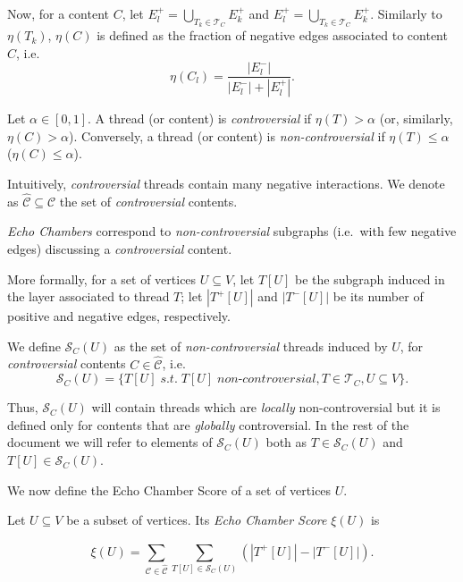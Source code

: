 Now, for a content $C$, let $E^{+}_l = \bigcup_{T_k \in \mathcal{T} _C} E^+_k$
and $E^{+}_l = \bigcup_{T_k \in \mathcal{T} _C} E^+_k$.
Similarly to $\eta(T_k)$, $\eta(C)$ is defined as the fraction of negative edges associated to
content $C$, i.e.
\begin{equation*}
	\eta(C_l) = \frac{|E^{-}_{l}|}{|E^{-}_{l}| + |E^{+}_{l}|}.
\end{equation*}

\begin{definition}
	Let $\alpha \in [0,1]$. A thread (or content) is \emph{controversial} if
	$\eta(T) > \alpha$ (or, similarly, $\eta(C) > \alpha $). Conversely, a
	thread (or content) is \emph{non-controversial} if $\eta(T) \leq \alpha$
	($\eta(C) \leq \alpha$).
\end{definition}

Intuitively, \emph{controversial} threads contain many negative
interactions. We denote as $\hat{\mathcal{C} } \subseteq \mathcal{C} $ the
set of \emph{controversial} contents.

\medskip

\emph{Echo Chambers} correspond to \emph{non-controversial} subgraphs
(i.e.\ with few negative edges) discussing a
\emph{controversial} content.

More formally, for a set of vertices $U \subseteq V$, let $T[U]$ be the subgraph induced in the layer associated to
thread $T$; let $|T^{+} [U]|$ and $|T^{-} [U]|$ be its number
of positive and negative edges, respectively.

We define $\mathcal{S}_C (U)$ as the set of \emph{non-controversial} threads
induced by $U$, for \textit{controversial} contents $C \in \mathcal{\hat{C}}$, i.e.
	{\small
		\begin{equation}
			\mathcal{S}_C (U) = \{ T[U] \; s.t. \; T[U] \; non\text{-}controversial, T \in \mathcal{T} _{C}, U \subseteq V\}.
		\end{equation}
	}

Thus, $\mathcal{S}_C (U)$ will contain threads which are \emph{locally}
non-controversial but it is defined only for contents that are \emph{globally}
controversial. In the rest of the document we will refer to elements of
$\mathcal{S}_C(U) $ both as $T \in \mathcal{S}_C(U) $ and $T[U] \in
	\mathcal{S}_C(U) $.

\medskip

We now define the Echo Chamber Score of a set of vertices $U$.

\begin{definition}
	Let $U \subseteq V$ be a subset of vertices. Its \emph{Echo Chamber Score}
	$\xi(U)$ is

	\begin{equation}
		\label{eq:echo-chamber-score}
		\xi(U) = \sum^{}_{\mathcal{C} \in \mathcal{\hat{C}}} \sum^{}_{T[U] \in
		\mathcal{S}_C (U)} (|T^{+} [U]| - |T ^{-} [U]|).
	\end{equation}
\end{definition}

